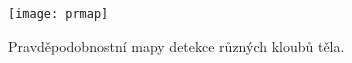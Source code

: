 \begin{figure}[h]\centering
    \texttt{[image: prmap]}
    \caption{
        \centering\small
        Pravděpodobnostní mapy detekce různých kloubů těla.
    }
    \label{fig:prmap}
\end{figure}







































